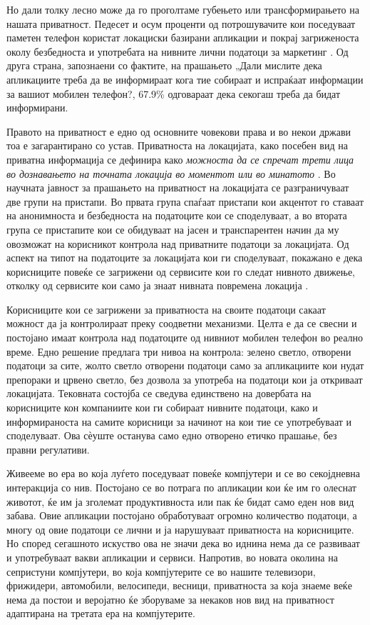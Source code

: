 \documentclass[12pt,a4paper]{article}
\begin{document}
Но дали толку лесно може да го проголтаме губењето или трансформирањето на
нашата приватност. Педесет и осум проценти од потрошувачите кои поседуваат
паметен телефон користат локациски базирани апликации и покрај загриженоста
околу безбедноста и употребата на нивните лични податоци за маркетинг
\cite{locationAppsPopular}. Од друга страна, запознаени со фактите, на прашањето
„Дали мислите дека апликациите треба да ве информираат кога тие собираат и
испраќаат информации за вашиот мобилен телефон?\cite{questionary}, 67.9\%
одговараат дека секогаш треба да бидат информирани.

Правото на приватност е едно од основните човекови права и во некои држави тоа е
загарантирано со устав. Приватноста на локацијата, како посебен вид на приватна
информација се дефинира како \emph{можноста да се спречат трети лица во
дознавањето на точната локација во моментот или во минатото}
\cite{beresford2003location}.  Во научната јавност за прашањето на приватност на
локацијата се разграничуваат две групи на пристапи. Во првата група
\cite{bettini2005protecting,gruteser2003anonymous} спаѓаат пристапи кои акцентот
го ставаат на анонимноста и безбедноста на податоците кои се споделуваат, а во
втората група \cite{smailagic2002location} се пристапите кои се обидуваат на
јасен и транспарентен начин да му овозможат на корисникот контрола над
приватните податоци за локацијата. Од аспект на типот на податоците за
локацијата кои ги споделуваат, покажано е дека корисниците повеќе се загрижени
од сервисите кои го следат нивното движење, отколку од сервисите кои само ја
знаат нивната повремена локација \cite{barkhuus2003location}.

Корисниците кои се загрижени за приватноста на своите податоци сакаат можност да
ја контролираат преку соодветни механизми. Целта е да се свесни и постојано
имаат контрола над податоците од нивниот мобилен телефон во реално време.
Едно решение \cite{forbes} предлага три нивоа на контрола: зелено светло,
отворени податоци за сите, жолто светло отворени податоци само за апликациите
кои нудат препораки и црвено светло, без дозвола за употреба на податоци кои ја
откриваат локацијата. Тековната состојба се сведува единствено на довербата на
корисниците кон компаниите кои ги собираат нивните податоци, како и
информираноста на самите корисници за начинот на кои тие се употребуваат и
споделуваат. Ова сѐуште останува само едно отворено етичко прашање, без правни
регулативи.

Живееме во ера во која луѓето поседуваат повеќе компјутери и се во секојдневна
интеракција со нив. Постојано се во потрага по апликации кои ќе им го
олеснат животот, ќе им ја зголемат продуктивноста или пак ќе бидат само еден нов
вид забава. Овие апликации постојано обработуваат огромно количество податоци, а
многу од овие податоци се лични и ја нарушуваат приватноста на корисниците. Но
според сегашното искуство ова не значи дека во иднина нема да се развиваат и
употребуваат вакви апликации и сервиси. Напротив, во новата околина на
сепристуни компјутери, во која компјутерите се во нашите телевизори, фрижидери,
автомобили, велосипеди, весници, приватноста за која знаеме веќе нема да постои
и веројатно ќе зборуваме за некаков нов вид на приватност адаптирана на третата
ера на компјутерите.




\end{document}
